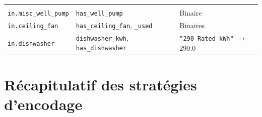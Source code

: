 \documentclass[11pt,a4paper]{article}
\begin{document}
\begin{longtable}{L{4.0cm}L{4.2cm}L{5.8cm}}
 \\
\texttt{in.misc\_well\_pump} & \texttt{has\_well\_pump} & Binaire \\
\texttt{in.ceiling\_fan}
  & \texttt{has\_ceiling\_fan}, \texttt{\_used} & Binaires \\
\texttt{in.dishwasher}
  & \texttt{dishwasher\_kwh}, \texttt{has\_dishwasher}
  & \texttt{"290 Rated kWh"} $\to$ 290.0 \\
\bottomrule
\end{longtable}

\section{Récapitulatif des stratégies d'encodage}
\end{document}
